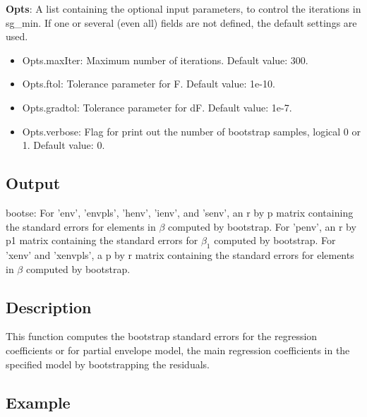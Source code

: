 \documentclass[a4paper,11pt,openany]{memoir}
\begin{document}
\begin{par}
\textbf{Opts}: A list containing the optional input parameters, to control the iterations in sg\_min. If one or several (even all) fields are not defined, the default settings are used.
\end{par} \vspace{1em}
\begin{itemize}
\setlength{\itemsep}{-1ex}
   \item Opts.maxIter: Maximum number of iterations.  Default value: 300.
   \item Opts.ftol: Tolerance parameter for F.  Default value: 1e-10.
   \item Opts.gradtol: Tolerance parameter for dF.  Default value: 1e-7.
   \item Opts.verbose: Flag for print out the number of bootstrap samples, logical 0 or 1. Default value: 0.
\end{itemize}


\subsection*{Output}

\begin{par}
bootse: For 'env', 'envpls', 'henv', 'ienv', and 'senv', an r by p matrix containing the standard errors for elements in $\beta$ computed by bootstrap.  For 'penv', an r by p1 matrix containing the standard errors for $\beta_1$ computed by bootstrap.  For 'xenv' and 'xenvpls', a p by r matrix containing the standard errors for elements in $\beta$ computed by bootstrap.
\end{par} \vspace{1em}


\subsection*{Description}

\begin{par}
This function computes the bootstrap standard errors for the regression coefficients or for partial envelope model, the main regression coefficients in the specified model by bootstrapping the residuals.
\end{par} \vspace{1em}

\subsection*{Example}
\end{document}
